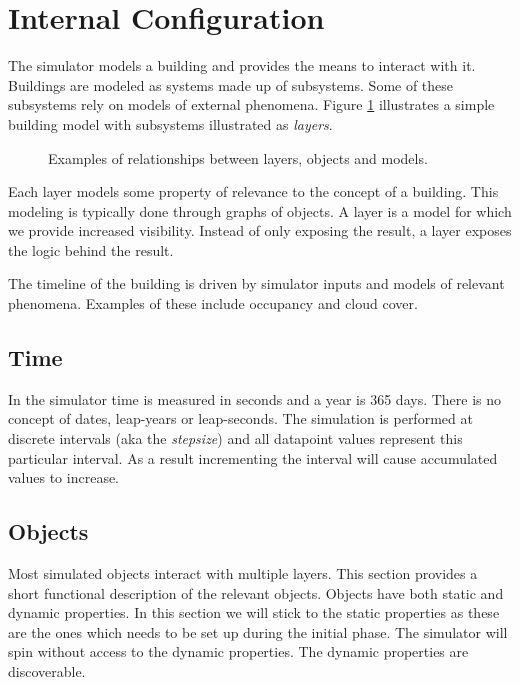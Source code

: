 \documentclass[10pt]{article}
\newcommand{\includeSVG}[1]{
  \texttt{[image: figs/\#1.pdf]}
}
\begin{document}
\section{Internal Configuration}
\label{sec:internals}

The simulator models a building and provides the means to interact with it. Buildings are modeled as systems made up of subsystems. Some of these subsystems rely on models of external phenomena. Figure \ref{fig:layers} illustrates a simple building model with subsystems illustrated as \textsl{layers}.

\begin{figure}[htb]
  \begin{center}
    \rotatebox{0}{\scalebox{0.375}{\includeSVG{layers}}}
  \end{center}
  \caption{Examples of relationships between layers, objects and models.}
  \label{fig:layers}
\end{figure}

Each layer models some property of relevance to the concept of a building. This modeling is typically done through graphs of objects. A layer is a model for which we provide increased visibility. Instead of only exposing the result, a layer exposes the logic behind the result.


The timeline of the building is driven by simulator inputs and models of relevant phenomena. Examples of these include occupancy and cloud cover.

\subsection{Time}

In the simulator time is measured in seconds and a year is 365 days. There is no concept of dates, leap-years or leap-seconds. The simulation is performed at discrete intervals (aka the \textsl{stepsize}) and all datapoint values represent this particular interval. As a result incrementing the interval will cause accumulated values to increase.

\subsection{Objects}

Most simulated objects interact with multiple layers. This section provides a short functional description of the relevant objects. Objects have both static and dynamic properties. In this section we will stick to the static properties as these are the ones which needs to be set up during the initial phase. The simulator will spin without access to the dynamic properties. The dynamic properties are discoverable.
\end{document}
